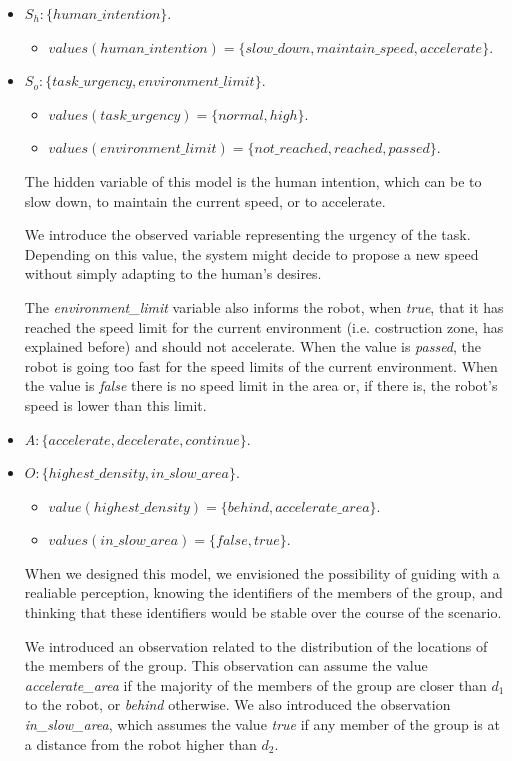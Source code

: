 \begin{itemize}
	\item $S_h:\{human\_intention\}$.
		\begin{itemize}
			\item $values(human\_intention)=\{slow\_down, maintain\_speed, accelerate\}$.
		\end{itemize}
	\item $S_o:\{task\_urgency,environment\_limit\}$.
		\begin{itemize}
			\item $values(task\_urgency)=\{normal,high\}$.
			\item $values(environment\_limit)=\{not\_reached,reached,passed\}$.
		\end{itemize}
		The hidden variable of this model is the human intention, which can be to slow down, to maintain the current speed, or to accelerate.

		We introduce the observed variable representing the urgency of the task. Depending on this value, the system might decide to propose a new speed without simply  adapting to the human's desires.

		The \textit{environment\_limit} variable also informs the robot, when \textit{true}, that it has reached the speed limit for the current environment (i.e. costruction zone, has explained before) and should not accelerate. When the value is \textit{passed}, the robot is going too fast for the speed limits of the current environment. When the value is \textit{false} there is no speed limit in the area or, if there is, the robot's speed is lower than this limit.
	
	\item $A:\{accelerate,decelerate,continue\}$.
	\item $O:\{highest\_density,in\_slow\_area\}$.
		\begin{itemize}
			\item $value(highest\_density)=\{behind,accelerate\_area\}$.
			\item $values(in\_slow\_area)=\{false,true\}$.
		\end{itemize}

		When we designed this model, we envisioned the possibility of guiding with a realiable perception, knowing the identifiers of the members of the group, and thinking that these identifiers would be stable over the course of the scenario. 

		We introduced an observation related to the distribution of the locations of the members of the group. This observation can assume the value \textit{accelerate\_area} if the majority of the members of the group are closer than $d_1$ to the robot, or \textit{behind} otherwise. We also introduced the observation \textit{in\_slow\_area}, which assumes the value \textit{true} if any member of the group is at a distance from the robot higher than $d_2$.


\end{itemize}

